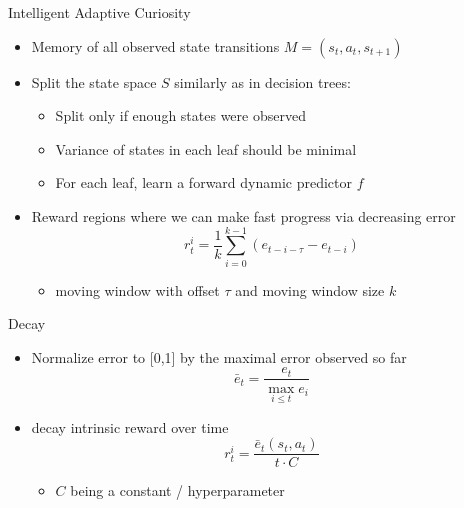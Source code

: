 \documentclass[aspectratio=169]{../latex_main/tntbeamer}  %
\begin{document}
\begin{frame}[c]{Intelligent Adaptive Curiosity~}
	
	\begin{itemize}
		\item Memory of all observed state transitions $M = (s_t, a_t, s_{t+1})$
		\item Split the state space $S$ similarly as in decision trees:
		\begin{itemize}
			\item Split only if enough states were observed
			\item Variance of states in each leaf should be minimal
			\item For each leaf, learn a forward dynamic predictor $f$
		\end{itemize}
		\item Reward regions where we can make fast progress via decreasing error
		$$r_t^i = \frac{1}{k} \sum_{i=0}^{k-1} (e_{t-i-\tau} - e_{t-i})$$
		\begin{itemize}
			\item moving window with offset $\tau$ and moving window size $k$
		\end{itemize}
		
	\end{itemize}
	
	
\end{frame}
\begin{frame}[c]{Decay~}
	
	\begin{itemize}
		\item Normalize error to [0,1] by the maximal error observed so far
		$$\bar{e}_t = \frac{e_t}{\max_{i \leq t} e_i} $$
		\item decay intrinsic reward over time
		$$r_t^i = \frac{\bar{e}_t(s_t, a_t)}{t \cdot C}$$ 
		\begin{itemize}
			\item $C$ being a constant / hyperparameter
		\end{itemize}
	\end{itemize}

	
\end{frame}
\end{document}
